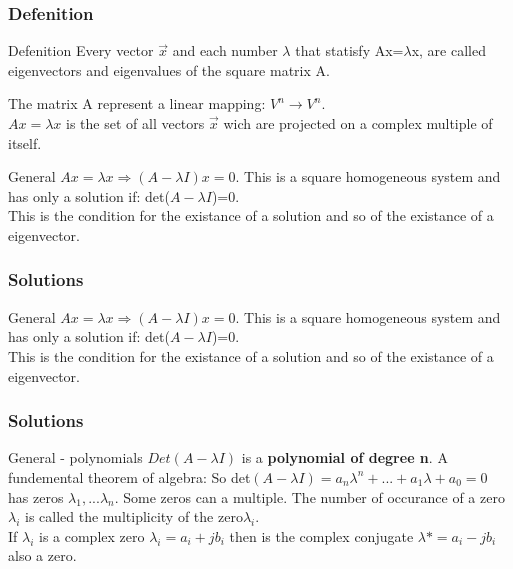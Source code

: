 \begin{frame}
	\frametitle{Defenition}
	\begin{block}{Defenition}
		Every vector $\overrightarrow{x}$ and each number $\lambda$ that statisfy  Ax=$\lambda$x, are called eigenvectors and eigenvalues of the square matrix A.\vspace{4mm}
		
		The matrix A represent a linear mapping: $V^n \rightarrow V^n$.\\
		$Ax=\lambda x$ is the set of all vectors $\overrightarrow{x}$ wich are projected on a complex multiple of itself.
	\end{block}
	\begin{block}{General}
		$Ax=\lambda x \Rightarrow (A-\lambda I)x=0$. This is a square homogeneous system and has only a solution if: det($A-\lambda I$)=0.\\
		This is the condition for the existance of a solution and so of the existance of a eigenvector.
	\end{block}
\end{frame}

\begin{frame}
	\frametitle{Solutions}
	\begin{block}{General}
		$Ax=\lambda x \Rightarrow (A-\lambda I)x=0$. This is a square homogeneous system and has only a solution if: det($A-\lambda I$)=0.\\
		This is the condition for the existance of a solution and so of the existance of a eigenvector.
	\end{block}
\end{frame}

\begin{frame}
	\frametitle{Solutions}
	\begin{block}{General - polynomials}
		$Det(A-\lambda I)$ is a \textbf{polynomial of degree n}. A fundemental theorem of algebra: 
		\vspace{4mm}
		So det$(A-\lambda I)=a_n\lambda^n +...+a_1\lambda+a_0=0$ has zeros $\lambda_1,...\lambda_n$. Some zeros can a multiple. The number of occurance of a zero $\lambda_i$ is called the multiplicity of the zero$\lambda_i$.\\
		If $\lambda_i$ is a complex zero $\lambda_i=a_i+jb_i$ then is the complex conjugate $\lambda*=a_i-jb_i$ also a zero.
	\end{block}
\end{frame}

